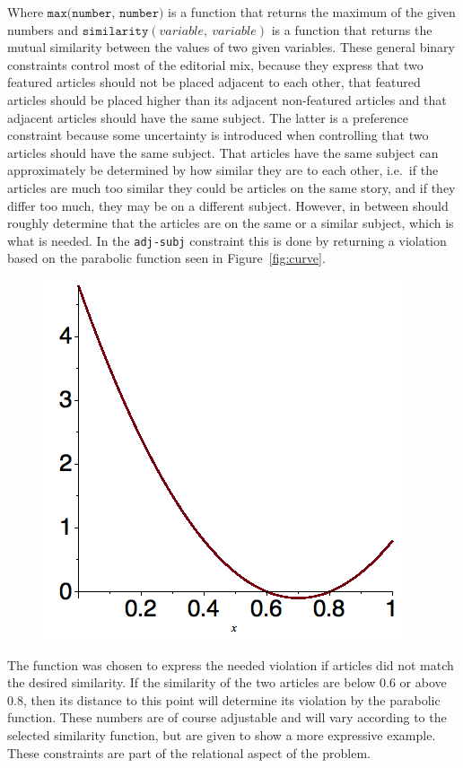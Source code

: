 Where $\texttt{max(number,\ number)}$ is a function that returns the maximum of the given numbers and $\texttt{similarity}(variable,\ variable)$ is a function that returns the mutual similarity between the values of two given variables. These general binary constraints control most of the editorial mix, because they express that two featured articles should not be placed adjacent to each other, that featured articles should be placed higher than its adjacent non-featured articles and that adjacent articles should have the same subject. The latter is a preference constraint because some uncertainty is introduced when controlling that two articles should have the same subject. That articles have the same subject can approximately be determined by how similar they are to each other, i.e.\ if the articles are much too similar they could be articles on the same story, and if they differ too much, they may be on a different subject. However, in between should roughly determine that the articles are on the same or a similar subject, which is what is needed. In the \texttt{adj-subj} constraint this is done by returning a violation based on the parabolic function seen in Figure~\ref{fig:curve}.
\begin{figure}%
\myfloatalign
\includegraphics[width=.45\textwidth]{img/curve}
\end{figure}

The function was chosen to express the needed violation if articles did not match the desired similarity. If the similarity of the two articles are below $0.6$ or above $0.8$, then its distance to this point will determine its violation by the parabolic function. These numbers are of course adjustable and will vary according to the selected similarity function, but are given to show a more expressive example. These constraints are part of the relational aspect of the problem.
